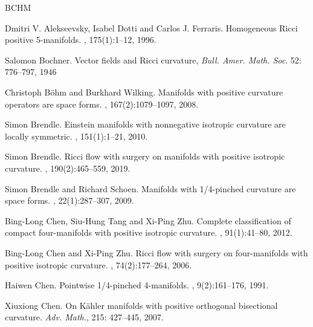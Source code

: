 \documentclass[12pt]{amsart}
\theoremstyle{plain}
\theoremstyle{definition}
\renewcommand{\>}{\rightarrow}
\numberwithin{equation}{section} %
\begin{document}
\begin{thebibliography}{BCHM}
	
	Dmitri V. Alekseevsky, Isabel Dotti and Carlos J. Ferraris.
	\newblock Homogeneous Ricci positive 5-manifolds.
	, 175(1):1--12, 1996.
	
	Salomon Bochner.  Vector fields and Ricci curvature, {\emph{Bull. Amer. Math. Soc}}. 52: 776--797,  1946
	
	Christoph B\"ohm and Burkhard Wilking.
	\newblock Manifolds with positive curvature operators are space forms. 
	, 167(2):1079--1097, 2008.
	

	
	Simon Brendle. 
	\newblock Einstein manifolds with nonnegative isotropic curvature are locally symmetric. 
	, 151(1):1--21, 2010.
	
	Simon Brendle. 
	\newblock Ricci flow with surgery on manifolds with positive isotropic curvature. 
	, 190(2):465--559, 2019.
	
	Simon Brendle and Richard Schoen. 
	\newblock Manifolds with 1/4-pinched curvature are space forms. 
	, 22(1):287--307, 2009.
	
	Bing-Long Chen, Siu-Hung Tang and Xi-Ping Zhu. 
	\newblock Complete classification of compact four-manifolds with positive isotropic curvature. 
	, 91(1):41--80, 2012.
	
	Bing-Long Chen and Xi-Ping Zhu. 
	\newblock Ricci flow with surgery on four-manifolds with positive isotropic curvature. 
	, 74(2):177--264, 2006.
	
	Haiwen Chen. 
	\newblock Pointwise 1/4-pinched 4-manifolds. 
	, 9(2):161--176, 1991.
	
	 Xiuxiong Chen. 
	On K\"ahler manifolds with positive orthogonal bisectional curvature. {\emph{Adv. Math.}},  215: 427–445, 2007.
	

\end{thebibliography}
\end{document}
